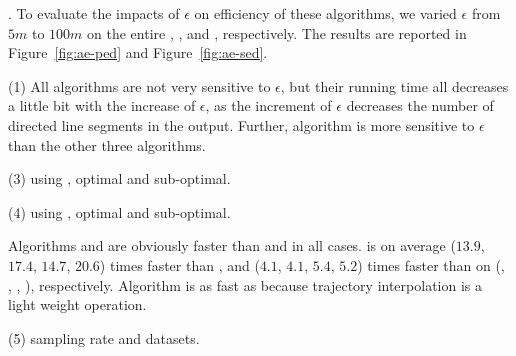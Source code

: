 .
To evaluate the impacts of $\epsilon$ on efficiency of these algorithms, we varied $\epsilon$ from $5m$ to $100m$ on the entire \taxi, \truck, \ucar and \geolife, respectively.
The results are reported in Figure~\ref{fig:ae-ped} and Figure~\ref{fig:ae-sed}.

\sstab (1) 
All algorithms are not very sensitive to $\epsilon$, but their running time all decreases a little bit with the increase of $\epsilon$,
as the increment of $\epsilon$ decreases the number of directed line segments in the output.
Further, algorithm \dpa is more sensitive to $\epsilon$ than the other three algorithms.

\sstab (3) using \ped, optimal and sub-optimal.

\sstab (4) using \sed, optimal and sub-optimal.

Algorithms \operb and \operba are obviously faster than \dpa and \fbqsa in all cases.
\operb is on average ($13.9$, $17.4$, $14.7$, {$20.6$}) times faster than \dpa, and ($4.1$, $4.1$, $5.4$, {$5.2$}) times faster than \fbqsa on (\taxi, \truck, \ucar, {\geolife}), respectively. Algorithm \operba is as fast as \operb because trajectory interpolation is a light weight operation.

\sstab (5) sampling rate and datasets.


